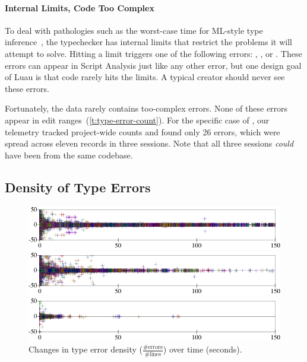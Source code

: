 \documentclass[english,submission,cleveref]{programming}
\begin{document}
\paragraph{Internal Limits, Code Too Complex}
\label{s:code-too-complex}

To deal with pathologies such as the worst-case time for ML-style type
inference~\cite{ktu-caap-1990,m-popl-1990}, the typechecker
has internal limits that restrict the problems it will attempt to solve.
Hitting a limit triggers one of the following errors:
,
, or
.
These errors can appear in Script Analysis just like any other
error, but one design goal of Luau is that code rarely hits the limits.
A typical creator should never see these errors.

Fortunately, the data rarely contains too-complex errors.
None of these errors appear in edit ranges~(\cref{t:type-error-count}).
For the specific case of , our telemetry tracked project-wide
counts and found only 26 errors, which were spread across eleven
records in three sessions.
Note that all three sessions \emph{could} have been from the same codebase.


\subsection{Density of Type Errors}

\begin{figure}[t]\centering

  \mnocheck{}
  \includegraphics[width=\columnwidth]{img/error-count-nocheck-row--te-density-diff.pdf}

  \mnonstrict{}
  \includegraphics[width=\columnwidth]{img/error-count-nonstrict-row--te-density-diff.pdf}

  \mstrict{}
  \includegraphics[width=\columnwidth]{img/error-count-strict-row--te-density-diff.pdf}
  \caption{Changes in type error density ($\frac{\mbox{\#errors}}{\mbox{\#lines}}$) over time (seconds).}
  \label{f:error-density}
\end{figure}
\end{document}
